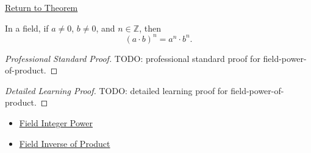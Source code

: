 \newpage
{}
\label{prf:field-power-of-product}

\begin{remark*}[Return]
\hyperref[cor:inverse-of-product-on-q]{Return to Theorem}
\end{remark*}

\begin{corollary*}
In a field, if $a\ne0$, $b\ne0$, and $n\in\mathbb{Z}$, then
\[
(a\cdot b)^n=a^n\cdot b^n.
\]
\end{corollary*}

\begin{proof}[Professional Standard Proof]
\LRAProofBodyStart
TODO: professional standard proof for field-power-of-product.
\end{proof}

\begin{proof}[Detailed Learning Proof]
\LRAProofBodyStart
TODO: detailed learning proof for field-power-of-product.
\end{proof}

\begin{remark*}
\end{remark*}

\begin{dependencies}
\begin{itemize}
  \item \hyperref[def:two-sided-inverse]{Field Integer Power}
  \item \hyperref[thm:field-inverse-of-product]{Field Inverse of Product}
\end{itemize}
\end{dependencies}

\clearpage
